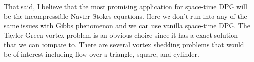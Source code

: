 \documentclass[letterpaper,12pt]{article}
\begin{document}
That said, I believe that the most promising application for space-time DPG will be the incompressible Navier-Stokes equations.
Here we don't run into any of the same issues with Gibbs phenomenon and we can use vanilla space-time DPG.
The Taylor-Green vortex problem is an obvious choice since it has a exact solution that we can compare to.
There are several vortex shedding problems that would be of interest including flow over a triangle, square, and cylinder.



\end{document}
